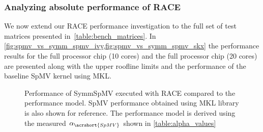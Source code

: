 \subsubsection{Analyzing absolute performance of RACE}
%
We now extend our \acrshort{RACE}  performance investigation to the full set of test matrices presented in~\cref{table:bench_matrices}. In \cref{fig:spmv_vs_symm_spmv_ivy,fig:spmv_vs_symm_spmv_skx} the performance results for the full \IVB processor chip (10 cores) and the full \SKX processor chip (20 cores) are presented along with the upper roofline limits and the performance of the baseline \acrshort{SpMV} kernel using \acrshort{MKL}.  
 \begin{figure}[tbp]
	\centering
	\hspace{1em}
	\caption{Performance of \acrshort{SymmSpMV} executed with \acrshort{RACE} compared to the performance model. \acrshort{SpMV} performance obtained using \acrshort{MKL} library is also shown for reference. The performance model is derived using the measured $\alpha_{\acrshort{SpMV}}$ shown in \cref{table:alpha_values}}
	\label{fig:SpMV_vs_SymmSpMV}
\end{figure}
